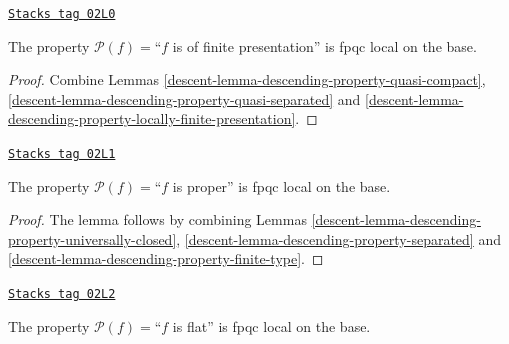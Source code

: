 \begin{lemma}
\label{descent-lemma-descending-property-finite-presentation}
\href{https://stacks.math.columbia.edu/tag/02L0}{\texttt{Stacks tag 02L0}}

The property $\mathcal{P}(f) =$``$f$ is of finite presentation''
is fpqc local on the base.
\end{lemma}

\begin{proof}

Combine Lemmas \ref{descent-lemma-descending-property-quasi-compact},
\ref{descent-lemma-descending-property-quasi-separated} and
\ref{descent-lemma-descending-property-locally-finite-presentation}.
\end{proof}

\begin{lemma}
\label{descent-lemma-descending-property-proper}
\href{https://stacks.math.columbia.edu/tag/02L1}{\texttt{Stacks tag 02L1}}

The property $\mathcal{P}(f) =$``$f$ is proper''
is fpqc local on the base.
\end{lemma}

\begin{proof}

The lemma follows by combining
Lemmas \ref{descent-lemma-descending-property-universally-closed},
\ref{descent-lemma-descending-property-separated}
and \ref{descent-lemma-descending-property-finite-type}.
\end{proof}

\begin{lemma}
\label{descent-lemma-descending-property-flat}
\href{https://stacks.math.columbia.edu/tag/02L2}{\texttt{Stacks tag 02L2}}

The property $\mathcal{P}(f) =$``$f$ is flat''
is fpqc local on the base.
\end{lemma}


